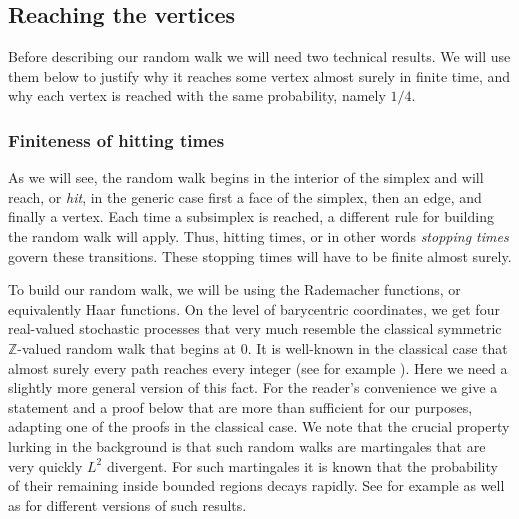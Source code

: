 \documentclass{amsart}
\newcommand{\Z}{\mathbb{Z}}
\theoremstyle{definition}
\theoremstyle{remark}
\begin{document}
\subsection{Reaching the vertices}

Before describing our random walk we will need two technical results. We will use them below to justify why it reaches some vertex almost surely in finite time, and why each vertex is reached with the same probability, namely $1/4$.

\subsubsection{Finiteness of hitting times} As we will see, the random walk begins in the interior of the simplex and will reach, or \emph{hit}, in the generic case first a face of the simplex, then an edge, and finally a vertex. Each time a subsimplex is reached, a different rule for building the random walk will apply. Thus, hitting times, or in other words \emph{stopping times} govern these transitions. These stopping times will have to be finite almost surely.

To build our random walk, we will be using the Rademacher functions, or equivalently Haar functions. On the level of barycentric coordinates, we get four real-valued stochastic processes that very much resemble the classical symmetric $\Z$-valued random walk that begins at 0. It is well-known in the classical case that almost surely every path reaches every integer (see for example \cite{Klenke2020}). Here we need a slightly more general version of this fact. For the reader's convenience we give a statement and a proof below that are more than sufficient for our purposes, adapting one of the proofs in the classical case. We note that the crucial property lurking in the background is that such random walks are martingales that are very quickly $L^2$ divergent. For such martingales it is known that the probability of their remaining inside bounded regions decays rapidly. See for example \cite{Makarov1990} as well as \cite[Lemma 9]{KS2024} for different versions of such results.
\end{document}
